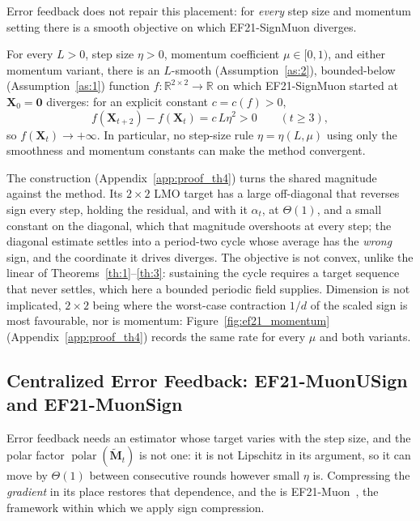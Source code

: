 Error feedback does not repair this placement: for \emph{every} step size and momentum setting there is a smooth objective on which EF21-SignMuon diverges.
\setcounter{theorem}{3}
\begin{theorem}\label{th:ef_div}
For every $L>0$, step size $\eta>0$, momentum coefficient $\mu\in[0,1)$, and either momentum variant, there is an $L$-smooth (Assumption~\ref{as:2}), bounded-below (Assumption~\ref{as:1}) function $f:\mathbb{R}^{2\times2}\!\to\mathbb{R}$ on which EF21-SignMuon started at $\mathbf{X}_0=\mathbf{0}$ diverges: for an explicit constant $c=c(f)>0$,
\begin{equation}\label{eq:exact_rate}
f(\mathbf{X}_{t+2})-f(\mathbf{X}_t)=c\,L\eta^2>0\qquad(t\ge3),
\end{equation}
so $f(\mathbf{X}_t)\to+\infty$. In particular, no step-size rule $\eta=\eta(L,\mu)$ using only the smoothness and momentum constants can make the method convergent.
\end{theorem}
The construction (Appendix~\ref{app:proof_th4}) turns the shared magnitude against the method. Its $2\times2$ LMO target has a large off-diagonal that reverses sign every step, holding the residual, and with it $\alpha_t$, at $\Theta(1)$, and a small constant on the diagonal, which that magnitude overshoots at every step; the diagonal estimate settles into a period-two cycle whose average has the \emph{wrong} sign, and the coordinate it drives diverges. The objective is not convex, unlike the linear  of Theorems~\ref{th:1}--\ref{th:3}: sustaining the cycle requires a target sequence that never settles, which here a bounded periodic field supplies. Dimension is not implicated, $2\times2$ being where the worst-case contraction $1/d$ of the scaled sign is most favourable, nor is momentum: Figure~\ref{fig:ef21_momentum} (Appendix~\ref{app:proof_th4}) records the same rate for every $\mu$ and both variants.

\subsection{Centralized Error Feedback: EF21-MuonUSign and EF21-MuonSign}
 Error feedback needs an estimator whose target varies with the step size, and the polar factor $\operatorname{polar}(\tilde{\mathbf{M}}_t)$ is not one: it is not Lipschitz in its argument, so it can move by $\Theta(1)$ between consecutive rounds however small $\eta$ is. Compressing the \emph{gradient} in its place restores that dependence, and the  is EF21-Muon~\cite{gruntkowska2025error}, the framework within which we apply sign compression.

